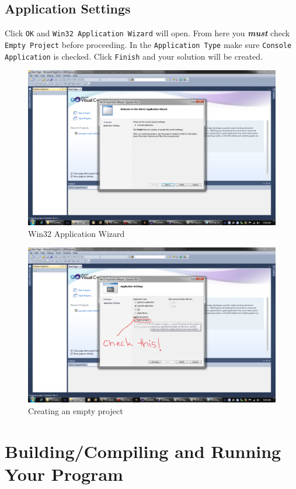 \documentclass{article}
\begin{document}
\subsection{Application Settings}
Click \verb|OK| and \verb|Win32 Application Wizard| will open. From here you \emph{\bfseries must} check \verb|Empty Project| before proceeding. In the \verb|Application Type| make sure \verb|Console Application| is checked. Click \verb|Finish| and your solution will be created.
\begin{figure}[h]
\centering
\includegraphics[width=\textwidth]{Win32_Application_Wizard.png}
\caption{Win32 Application Wizard}
\end{figure}
\begin{figure}[H]
\centering
\includegraphics[width=\textwidth]{Application_Settings_Empty_Project.png}
\caption{Creating an empty project}
\end{figure}

\section{Building/Compiling and Running Your Program}
\end{document}
